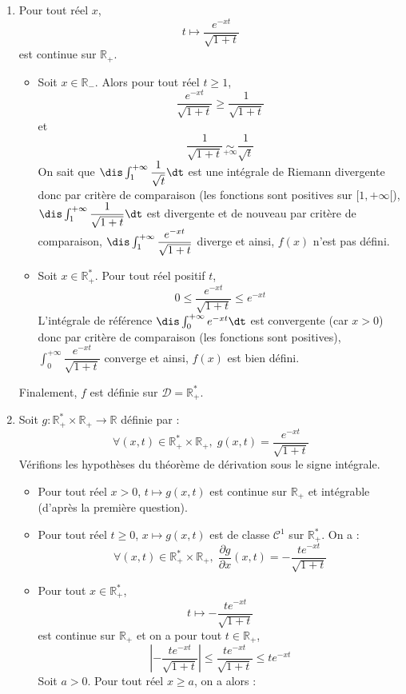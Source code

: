 \documentclass[a4paper,10pt]{report}
\begin{document}
\begin{enumerate}
\item Pour tout réel $x$,
$$ t \mapsto \dfrac{e^{-xt}}{\sqrt{1+t}}$$
est continue sur $\mathbb{R}_+$.

\begin{itemize}
\item Soit $x \in \mathbb{R}_{-}$. Alors pour tout réel $t \geq 1$,
$$ \dfrac{e^{-xt}}{\sqrt{1+t}} \geq \dfrac{1}{\sqrt{1+t}}$$
et 
$$ \dfrac{1}{\sqrt{1+t}} \underset{+ \infty}{\sim} \dfrac{1}{\sqrt{t}}$$
On sait que $\dis \int_1^{+ \infty} \dfrac{1}{\sqrt{t}} \dt$ est une intégrale de Riemann divergente donc par critère de comparaison (les fonctions sont positives sur $[1, + \infty[$), $\dis \int_1^{+ \infty}  \dfrac{1}{\sqrt{1+t}}  \dt$ est divergente et de nouveau par critère de comparaison, $\dis \int_1^{+ \infty} \dfrac{e^{-xt}}{\sqrt{1+t}}$ diverge et ainsi, $f(x)$ n'est pas défini.
\item Soit $x \in \mathbb{R}_+^*$. Pour tout réel positif $t$,
$$ 0 \leq  \dfrac{e^{-xt}}{\sqrt{1+t}} \leq e^{-xt}$$
L'intégrale de référence $\dis \int_0^{+ \infty} e^{-xt} \dt$ est convergente (car $x>0$) donc par critère de comparaison (les fonctions sont positives), $ \int_0^{+ \infty} \dfrac{e^{-xt}}{\sqrt{1+t}}$ converge et ainsi, $f(x)$ est bien défini.
\end{itemize}
Finalement, $f$ est définie sur $\mathcal{D}= \mathbb{R}_+^*$.
\item Soit $g : \mathbb{R}_+^* \times \mathbb{R}_+ \rightarrow \mathbb{R}$ définie par :
$$ \forall (x,t) \in \mathbb{R}_+^* \times \mathbb{R}_+, \; g(x,t) = \dfrac{e^{-xt}}{\sqrt{1+t}} $$
Vérifions les hypothèses du théorème de dérivation sous le signe intégrale.
\begin{itemize}
\item Pour tout réel $x>0$, $t \mapsto g(x,t)$ est continue sur $\mathbb{R}_+$ et intégrable (d'après la première question).
\item Pour tout réel $t \geq 0$, $x \mapsto g(x,t)$ est de classe $\mathcal{C}^1$ sur $\mathbb{R}_+^*$. On a :
$$ \forall (x,t) \in \mathbb{R}_+^* \times \mathbb{R}_+, \; \dfrac{\partial g}{\partial x}(x,t) =  -  \dfrac{te^{-xt}}{\sqrt{1+t}}$$
\item Pour tout $x \in \mathbb{R}_+^*$,
$$ t \mapsto   -  \dfrac{te^{-xt}}{\sqrt{1+t}}$$
est continue sur $\mathbb{R}_+$ et on a pour tout $t \in \mathbb{R}_+$,
$$ \left\vert  -  \dfrac{te^{-xt}}{\sqrt{1+t}} \right\vert \leq  \dfrac{te^{-xt}}{\sqrt{1+t}} \leq t e^{-xt}$$
Soit $a>0$. Pour tout réel $x \geq a$, on a alors :

\end{itemize}
\end{enumerate}
\end{document}
